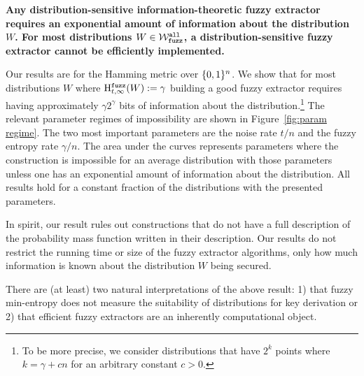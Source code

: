 \begin{displayquote}
\textbf{Any distribution-sensitive information-theoretic fuzzy extractor requires an exponential amount of information about the distribution $W$.  For most distributions $W \in \mathcal{W}_{\mathtt{fuzz}}^{\mathtt{all}}$, a distribution-sensitive fuzzy extractor cannot be efficiently implemented.} 
\end{displayquote} 
Our results are for the Hamming metric over $\{0, 1\}^n$. We show that for most distributions $W$ where $\mathrm{H}^{\mathtt{fuzz}}_{t,\infty}(W) := \gamma$ building a good fuzzy extractor requires having approximately $\gamma 2^\gamma$ bits of information about the distribution.\footnote{To be more precise,  we consider distributions that have $2^k$ points where $k = \gamma + c n$ for an arbitrary constant $c>0$.}
The relevant parameter regimes of impossibility are shown in Figure~\ref{fig:param regime}.  The two most important parameters are the noise rate $t/n$ and the fuzzy entropy rate $\gamma/n$. The area under the curves represents parameters where the construction is impossible for an average distribution with those parameters unless one has an exponential amount of information about the distribution.  All results hold for a constant fraction of the distributions with the presented parameters.

In spirit, our result rules out constructions that do not have a full description of the probability mass function written in their description.  Our results do not restrict the running time or size of the fuzzy extractor algorithms, only how much information is known about the distribution $W$ being secured.  





There are (at least) two natural interpretations of the above result: 1) that fuzzy min-entropy does not measure the suitability of distributions for key derivation or 2) that efficient fuzzy extractors are an inherently computational object.

